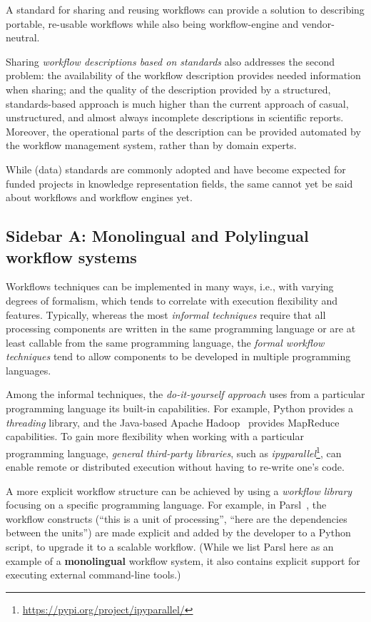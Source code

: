 A standard for sharing and reusing workflows can provide a solution to describing portable, re-usable workflows while also being workflow-engine and vendor-neutral.

Sharing \textit{workflow descriptions based on standards} also addresses the second problem: the availability of the workflow description provides needed information when sharing; and the quality of the description provided by a structured, standards-based approach is much higher than the current approach of casual, unstructured, and almost always incomplete descriptions in scientific reports. Moreover, the operational parts of the description can be provided automated by the workflow management system, rather than by domain experts.

While (data) standards are commonly adopted and have become expected for funded projects in knowledge representation fields, the same cannot yet be said about workflows and workflow engines yet.

\subsection{Sidebar A: Monolingual and Polylingual workflow systems} \label{sec:sidebar:a}

Workflows techniques can be implemented in many ways, i.e., with varying degrees of formalism, which tends to correlate with execution flexibility and features. Typically, whereas the most \textit{informal techniques} require that all processing components are written in the same programming language or are at least callable from the same programming language, the \textit{formal workflow techniques} tend to allow components to be developed in multiple programming languages. 

Among the informal techniques, the \textit{do-it-yourself approach} uses from a particular programming language its built-in capabilities. For example, Python provides a \emph{threading} library, and the Java-based Apache Hadoop~\cite{taylor_overview_2010} provides MapReduce capabilities. To gain more flexibility when working with a particular programming language, \textit{general third-party libraries}, such as \emph{ipyparallel}\footnote{\url{https://pypi.org/project/ipyparallel/}}, can enable remote or distributed execution without having to re-write one's code.

A more explicit workflow structure can be achieved by using a \textit{workflow library} focusing on a specific programming language. For example, in Parsl~\cite{babuji_parsl_2019}, the workflow constructs (``this is a unit of processing'', ``here are the dependencies between the units'') are made explicit and added by the developer to a Python script, to upgrade it to a scalable workflow. (While we list Parsl here as an example of a \textbf{monolingual} workflow system, it also contains explicit support for executing external command-line tools.)

